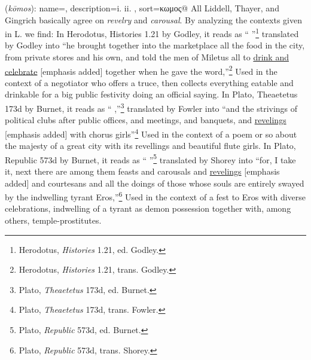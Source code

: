 \item[Revel,]

(\textit{kōmos}):
{
    name=,
    description={i.  ii. },
    sort=κωμος@
}
All Liddell, Thayer, and Gingrich basically agree on \emph{revelry} and \emph{carousal}. By analyzing the contexts given in L. we find: 
In Herodotus, Histories 1.21 by Godley, it reads as `` \underline{} ''\footnote{Herodotus, \emph{Histories} 1.21, ed. Godley.}
translated by Godley into ``he brought together into the marketplace all the food in the city, from private stores and his own, and told the men of Miletus all to \underline{drink and celebrate} [emphasis added] together when he gave the word,''\footnote{Herodotus, \emph{Histories} 1.21, trans. Godley.} 
Used in the context of a negotiator who offers a truce, then collects everything eatable and drinkable for a big public festivity doing an official saying. 
In Plato, Theaetetus 173d by Burnet, it reads as `` \underline{},''\footnote{Plato, \emph{Theaetetus} 173d, ed. Burnet.}
translated by Fowler into ``and the strivings of political clubs after public offices, and meetings, and banquets, and \underline{revelings} [emphasis added] with chorus girls''\footnote{Plato, \emph{Theaetetus} 173d, trans. Fowler.} 
Used in the context of a poem or so about the majesty of a great city with its revellings and beautiful flute girls.
In Plato, Republic 573d by Burnet, it reads as `` \underline{} ''\footnote{Plato, \emph{Republic} 573d, ed. Burnet.}
translated by Shorey into ``for, I take it, next there are among them feasts and carousals and \underline{revelings} [emphasis added] and courtesans and all the doings of those whose souls are entirely swayed by the indwelling tyrant Eros,''\footnote{Plato, \emph{Republic} 573d, trans. Shorey.}
Used in the context of a fest to Eros with diverse celebrations, indwelling of a tyrant as demon possession together with, among others, temple-prostitutes. 
